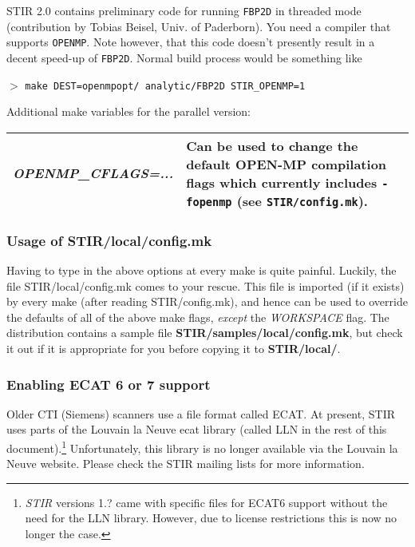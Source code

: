 \documentclass{article}
\newcommand{\cmdline}[1]{\par \noindent $>$ \texttt{#1}\par}
\begin{document}
STIR 2.0 contains preliminary code for running \texttt{FBP2D} in threaded mode
(contribution by Tobias Beisel, Univ. of Paderborn). You need a compiler that 
supports \texttt{OPENMP}. Note however, that this code doesn't presently result 
in a decent speed-up of \texttt{FBP2D}. Normal build process would be something like

\cmdline{make DEST=openmpopt/ analytic/FBP2D STIR\_OPENMP=1}


Additional make variables for the parallel version:

\begin{longtable}{|p{\MakeTableFirstCol}|p{\MakeTableSecondCol}|}
\hline

{\raggedright
\textit{OPENMP\_CFLAGS=...}} &
{\raggedright
Can be used to change the default OPEN-MP compilation flags which currently includes
\texttt{-fopenmp} (see 
\texttt{STIR/config.mk}).
} \\
\hline
\end{longtable}

\subsubsection{
Usage of STIR/local/config.mk}
\label{sec:local_config.mk}

Having to type in the above options at every make is quite painful. 
Luckily, the file STIR/local/config.mk comes to your rescue. 
This file is imported (if it exists) by every make (after reading 
STIR/config.mk), and hence can be used to override the defaults 
of all of the above make flags, \textit{except} the \textit{WORKSPACE} flag. 
The distribution contains a sample file \textbf{STIR/samples/local/config.mk}, 
but check it out if it is appropriate for you before copying 
it to \textbf{STIR/local/}.

\subsubsection{
Enabling ECAT 6 or 7 support}
\label{sec:ECAT67support}
Older CTI (Siemens) scanners use a file format called ECAT.
At present, STIR uses parts of the Louvain la Neuve ecat library (called LLN in
the rest of this document).\footnote{\textit{STIR} versions 1.? came with
specific files for ECAT6 support without the need for the LLN library. 
However, due to license restrictions this is now no longer the case.} 
Unfortunately, this library is no longer
available via the Louvain la Neuve website. Please check the STIR
mailing lists for more information.
\end{document}
